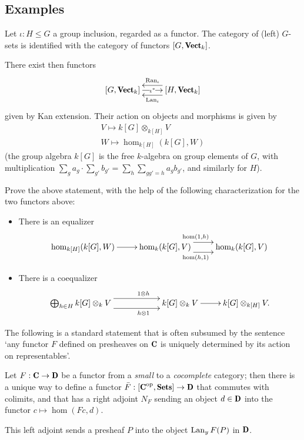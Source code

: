 \documentclass[a4paper,12pt]{amsart}
\begin{document}
\subsection{Examples}
\begin{example}
Let $\iota\colon H\le G$ a group inclusion, regarded as a functor. The category of (left) $G$-sets is identified with the category of functors $[G,\cate{Vect}_k]$. 

There exist then functors
\[
\xymatrix{
	[G,\cate{Vect}_k] \ar[r]|{\iota^*} & [H,\cate{Vect}_k] \ar@<6pt>[l]^{\Lan_\iota}\ar@<-6pt>[l]_{\Ran_\iota}
}
\]
given by Kan extension. Their action on objects and morphisms is given by
\begin{gather*}
V \mapsto k[G]\otimes_{k[H]}V\\
W\mapsto \hom_{k[H]}(k[G],W)
\end{gather*}
(the group algebra $k[G]$ is the free $k$-algebra on group elements of $G$, with multiplication $\sum_g a_g \cdot \sum_{g'} b_{g'} = \sum_h\sum_{gg'=h}a_g b_{g'}$, and similarly for $H$).
\end{example}
\begin{exercise}
Prove the above statement, with the help of the following characterization for the two functors above:
\begin{itemize}
	\item There is an equalizer
	\[
	\xymatrix{
		\hom_{k[H]}(k[G],W) \ar[r]& \hom_k(k[G],V) \ar@<6pt>[r]^(.4){\hom(1,h)}\ar@<-6pt>[r]_(.4){\hom(h,1)} & \hom_k(k[G],V)
	}
	\]
	\item There is a coequalizer
	\[
	\xymatrix{
		**[l]\bigoplus_{h\in H}k[G]\otimes_k V \ar@<6pt>[r]^{1\otimes h}\ar@<-6pt>[r]_{h\otimes 1} & k[G]\otimes_k V \ar[r] & k[G]\otimes_{k[H]}V.
	}
	\]
\end{itemize}
\end{exercise}
The following is a standard statement that is often subsumed by the sentence `any functor $F$ defined on presheaves on $\C$ is uniquely determined by its action on representables'.
\begin{example}
Let $F:\C \to \D$ be a functor from a \emph{small} to a \emph{cocomplete} category; then there is a unique way to define a functor $\bar F : [\C^\text{op}, \Sets] \to \D$ that commutes with colimits, and that has a right adjoint $N_F$ sending an object $d\in\D$ into the functor $c\mapsto \hom(Fc,d)$. 

This left adjoint sends a presheaf $P$ into the object $\operatorname{Lan}_yF(P)$ in $\D$.
\end{example}
\end{document}
